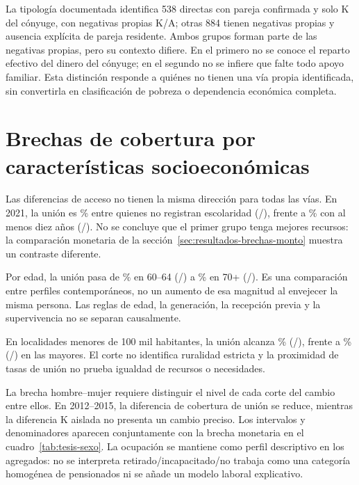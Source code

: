 La tipología documentada identifica 538 directas con pareja confirmada y
solo K del cónyuge, con negativas propias K/A; otras 884 tienen negativas
propias y ausencia explícita de pareja residente. Ambos grupos forman parte
de las negativas propias, pero su contexto difiere. En el primero no se
conoce el reparto efectivo del dinero del cónyuge; en el segundo no se
infiere que falte todo apoyo familiar. Esta distinción responde a quiénes
no tienen una vía propia identificada, sin convertirla en clasificación
de pobreza o dependencia económica completa.

\section{Brechas de cobertura por características socioeconómicas}
\label{sec:resultados-perfiles}

Las diferencias de acceso no tienen la misma dirección para todas las vías.
En 2021, la unión es \% entre quienes no
registran escolaridad (/),
frente a \% con al menos diez años
(/).
No se concluye que el primer grupo tenga mejores recursos:
la comparación monetaria de la sección~\ref{sec:resultados-brechas-monto}
muestra un contraste diferente.

Por edad, la unión pasa de \% en 60--64
(/)
a \% en 70+
(/).
Es una comparación entre perfiles contemporáneos, no un aumento de esa
magnitud al envejecer la misma persona. Las reglas de edad, la generación,
la recepción previa y la supervivencia no se separan causalmente.

En localidades menores de 100 mil habitantes, la unión alcanza
\%
(/),
frente a \%
(/)
en las mayores. El corte no identifica ruralidad estricta y la proximidad
de tasas de unión no prueba igualdad de recursos o necesidades.

La brecha hombre--mujer requiere distinguir el nivel de cada corte del
cambio entre ellos. En 2012--2015, la diferencia de cobertura de unión
se reduce, mientras la diferencia K aislada no presenta un cambio preciso.
Los intervalos y denominadores aparecen conjuntamente con la brecha monetaria
en el cuadro~\ref{tab:tesis-sexo}. La ocupación se mantiene como perfil
descriptivo en los agregados: no se interpreta retirado/incapacitado/no
trabaja como una categoría homogénea de pensionados ni se añade un modelo
laboral explicativo.

